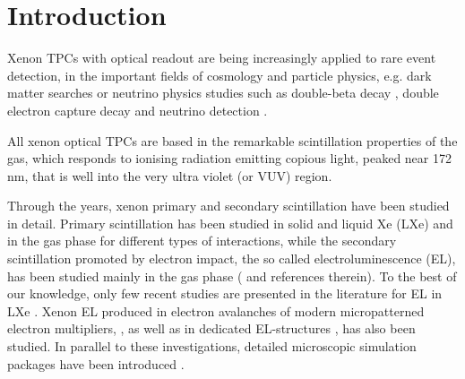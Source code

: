 \documentclass[%
 reprint,
superscriptaddress,
 amsmath,amssymb,
 aps,
]{revtex4-2}
\begin{document}
\maketitle


\section{\label{sec:intro}Introduction}

Xenon TPCs with optical readout are being increasingly applied to rare event detection, in the important fields of cosmology and particle physics, e.g. dark matter searches \cite{1,2,3,4,5} or neutrino physics studies such as double-beta decay
\cite{6,7,8,9,10}, double electron capture decay \cite{11} and neutrino detection \cite{12,13}.

All xenon optical TPCs are based in the remarkable scintillation properties of the gas, which responds to ionising radiation emitting copious light, peaked near 172 nm, that is well into the very ultra violet (or VUV) region. 
 
Through the years, xenon primary and secondary scintillation have been studied in detail. Primary scintillation has been studied in solid and liquid Xe (LXe) \cite{14,15,16,17,18,18a} and in the gas phase \cite{21,22,23,19,20} for different types of interactions, while the secondary scintillation promoted by electron impact, the so called electroluminescence (EL), has been studied mainly in the gas phase (\cite{24,25,44,38} and references therein). To the best of our knowledge, only few recent studies are presented in the literature for EL in LXe \cite{26,27}. Xenon EL produced in electron avalanches of modern micropatterned electron multipliers, 
\cite{28,29,30}, as well as in dedicated EL-structures 
\cite{30a,30b}, has also been studied. In parallel to these investigations, detailed microscopic simulation packages have been introduced 
\cite{31,32}. 
\end{document}
